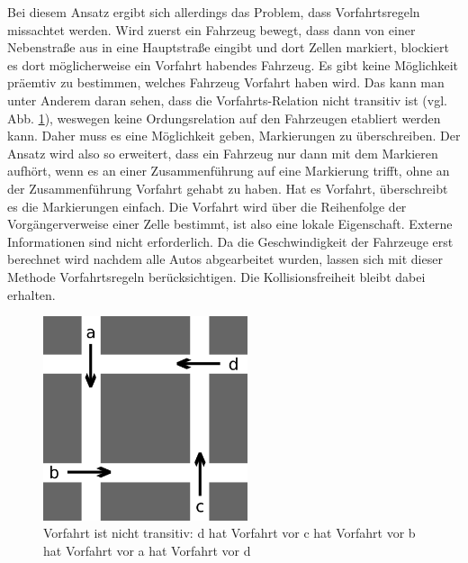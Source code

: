 \documentclass[11pt, a4paper]{article}
\begin{document}
Bei diesem Ansatz ergibt sich allerdings das Problem, dass Vorfahrtsregeln missachtet werden. Wird zuerst ein Fahrzeug bewegt, dass dann von einer Nebenstraße aus in eine Hauptstraße eingibt und dort Zellen markiert, blockiert es dort möglicherweise ein Vorfahrt habendes Fahrzeug. Es gibt keine Möglichkeit präemtiv zu bestimmen, welches Fahrzeug Vorfahrt haben wird. Das kann man unter Anderem daran sehen, dass die Vorfahrts-Relation nicht transitiv ist (vgl. Abb. \ref{fig:rightOfWayNotTransitive}), weswegen keine Ordungsrelation auf den Fahrzeugen etabliert werden kann. Daher muss es eine Möglichkeit geben, Markierungen zu überschreiben. Der Ansatz wird also so erweitert, dass ein Fahrzeug nur dann mit dem Markieren aufhört, wenn es an einer Zusammenführung auf eine Markierung trifft, ohne an der Zusammenführung Vorfahrt gehabt zu haben. Hat es Vorfahrt, überschreibt es die Markierungen einfach. Die Vorfahrt wird über die Reihenfolge der Vorgängerverweise einer Zelle bestimmt, ist also eine lokale Eigenschaft. Externe Informationen sind nicht erforderlich. Da die Geschwindigkeit der Fahrzeuge erst berechnet wird nachdem alle Autos abgearbeitet wurden, lassen sich mit dieser Methode Vorfahrtsregeln berücksichtigen. Die Kollisionsfreiheit bleibt dabei erhalten.
\begin{figure}[h!]
	\centering
	\includegraphics[width=6cm]{img/rightOfWay}
	\caption{Vorfahrt ist nicht transitiv: d hat Vorfahrt vor c hat Vorfahrt vor b hat Vorfahrt vor a hat Vorfahrt vor d}
	\label{fig:rightOfWayNotTransitive}
\end{figure}
\end{document}
